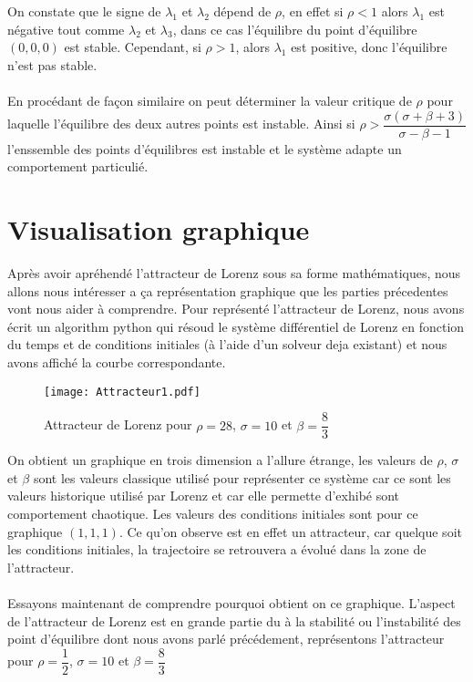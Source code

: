 On constate que le signe de  $\lambda_{1}$ et $\lambda_{2}$ dépend de $\rho$, en effet si $\rho<1$ alors $\lambda_{1}$ est négative tout comme $\lambda_{2}$ et $\lambda_{3}$, dans ce cas l'équilibre du point d'équilibre $(0,0,0)$ est stable. Cependant, si $\rho>1$, alors $\lambda_{1}$ est positive, donc l'équilibre n'est pas stable.\\\\
 En procédant de façon similaire on peut déterminer la valeur critique de $\rho$ pour laquelle l'équilibre des deux autres points est instable. Ainsi si $\rho > \dfrac{\sigma(\sigma+\beta+3)}{\sigma-\beta-1}$ l'enssemble des points d'équilibres est instable et le système adapte un comportement particulié.
 \section{Visualisation graphique}
Après avoir apréhendé l'attracteur de Lorenz sous sa forme mathématiques, nous allons nous intéresser a ça représentation graphique que les parties précedentes vont nous aider à comprendre. Pour représenté l'attracteur de Lorenz, nous avons écrit un algorithm python qui résoud le système différentiel de Lorenz en fonction du temps et de conditions initiales (à l'aide d'un solveur deja existant) et nous avons affiché la courbe correspondante.\\

\begin{figure}
        \texttt{[image: Attracteur1.pdf]}
        \caption{Attracteur de Lorenz pour $\rho=28$, $\sigma=10$ et $\beta=\dfrac{8}{3}$} 
\end{figure} 

On obtient un graphique en trois dimension a l'allure étrange, les valeurs de $\rho$, $\sigma$ et $\beta$ sont les valeurs classique utilisé pour représenter ce système car ce sont les valeurs historique utilisé par Lorenz et car elle permette d'exhibé sont comportement chaotique. Les valeurs des conditions initiales sont pour ce graphique $(1,1,1)$. Ce qu'on observe est en effet un attracteur, car quelque soit les conditions initiales, la trajectoire se retrouvera a évolué dans la zone de l'attracteur.\\\\
Essayons maintenant de comprendre pourquoi obtient on ce graphique. L'aspect de l'attracteur de Lorenz est en grande partie du à la stabilité ou l'instabilité des point d'équilibre dont nous avons parlé précédement, représentons l'attracteur pour $\rho=\dfrac{1}{2}$, $\sigma=10$ et $\beta=\dfrac{8}{3}$  

